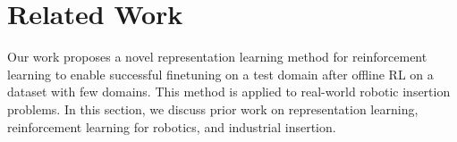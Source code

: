 \documentclass[letterpaper, 10 pt, conference, final]{ieeeconf}   %
\begin{document}

\section{Related Work}


Our work proposes a novel representation learning method for reinforcement learning to enable successful finetuning on a test domain after offline RL on a dataset with few domains. This method is applied to real-world robotic insertion problems. In this section, we discuss prior work on representation learning, reinforcement learning for robotics, and industrial insertion.
\end{document}
